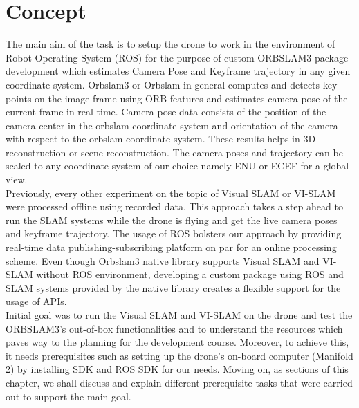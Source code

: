 \chapter{Concept}
\label{ch:concept}
The main aim of the task is to setup the drone to work in the environment of Robot Operating System (ROS) for the purpose of custom ORBSLAM3 package development which estimates Camera Pose and Keyframe trajectory in any given coordinate system. Orbslam3 or Orbslam in general computes and detects key points on the image frame using ORB features and estimates camera pose of the current frame in real-time. Camera pose data consists of the position of the camera center in the orbslam coordinate system and orientation of the camera with respect to the orbslam coordinate system. These results helps in 3D reconstruction or scene reconstruction. The camera poses and trajectory can be scaled to any coordinate system of our choice namely ENU or ECEF for a global view. \\

Previously, every other experiment on the topic of Visual SLAM or VI-SLAM were processed offline using recorded data. This approach takes a step ahead to run the SLAM systems while the drone is flying and get the live camera poses and keyframe trajectory. The usage of ROS bolsters our approach by providing real-time data publishing-subscribing platform on par for an online processing scheme. Even though Orbslam3 native library supports Visual SLAM and VI-SLAM without ROS environment, developing a custom package using ROS and SLAM systems provided by the native library creates a flexible support for the usage of APIs. \\

Initial goal was to run the Visual SLAM and VI-SLAM on the drone and test the ORBSLAM3's out-of-box functionalities and to understand the resources which paves way to the planning for the development course. Moreover, to achieve this, it needs prerequisites such as setting up the drone's on-board computer (Manifold 2) by installing SDK and ROS SDK for our needs. Moving on, as sections of this chapter, we shall discuss and explain different prerequisite tasks that were carried out to support the main goal.

